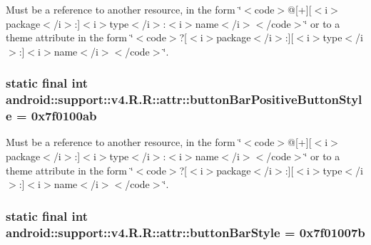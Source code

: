 Must be a reference to another resource, in the form \char`\"{}$<$code$>$@\mbox{[}+\mbox{]}\mbox{[}$<$i$>$package$<$/i$>$:\mbox{]}$<$i$>$type$<$/i$>$:$<$i$>$name$<$/i$>$$<$/code$>$\char`\"{} or to a theme attribute in the form \char`\"{}$<$code$>$?\mbox{[}$<$i$>$package$<$/i$>$:\mbox{]}\mbox{[}$<$i$>$type$<$/i$>$:\mbox{]}$<$i$>$name$<$/i$>$$<$/code$>$\char`\"{}. \hypertarget{classandroid_1_1support_1_1v4_1_1_r_1_1attr_a4379082fd003f1146261778f06ef298}{
\subsubsection[{buttonBarPositiveButtonStyle}]{\setlength{\rightskip}{0pt plus 5cm}static final int android::support::v4.R.R::attr::buttonBarPositiveButtonStyle = 0x7f0100ab}}
\label{classandroid_1_1support_1_1v4_1_1_r_1_1attr_a4379082fd003f1146261778f06ef298}


Must be a reference to another resource, in the form \char`\"{}$<$code$>$@\mbox{[}+\mbox{]}\mbox{[}$<$i$>$package$<$/i$>$:\mbox{]}$<$i$>$type$<$/i$>$:$<$i$>$name$<$/i$>$$<$/code$>$\char`\"{} or to a theme attribute in the form \char`\"{}$<$code$>$?\mbox{[}$<$i$>$package$<$/i$>$:\mbox{]}\mbox{[}$<$i$>$type$<$/i$>$:\mbox{]}$<$i$>$name$<$/i$>$$<$/code$>$\char`\"{}. \hypertarget{classandroid_1_1support_1_1v4_1_1_r_1_1attr_84d7b49e0aa74005f7e21f3b03838a8c}{
\subsubsection[{buttonBarStyle}]{\setlength{\rightskip}{0pt plus 5cm}static final int android::support::v4.R.R::attr::buttonBarStyle = 0x7f01007b}}
\label{classandroid_1_1support_1_1v4_1_1_r_1_1attr_84d7b49e0aa74005f7e21f3b03838a8c}


